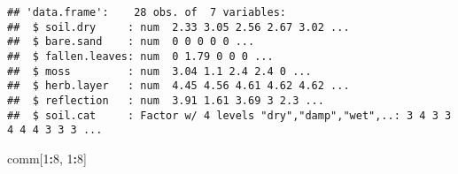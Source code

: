 \documentclass[
]{article}
\newenvironment{Shaded}{\begin{snugshade}}{\end{snugshade}}
\newcommand{\CommentTok}[1]{\textcolor[rgb]{0.56,0.35,0.01}{\textit{#1}}}
\newcommand{\DataTypeTok}[1]{\textcolor[rgb]{0.13,0.29,0.53}{#1}}
\newcommand{\DecValTok}[1]{\textcolor[rgb]{0.00,0.00,0.81}{#1}}
\newcommand{\KeywordTok}[1]{\textcolor[rgb]{0.13,0.29,0.53}{\textbf{#1}}}
\newcommand{\NormalTok}[1]{#1}
\newcommand{\OperatorTok}[1]{\textcolor[rgb]{0.81,0.36,0.00}{\textbf{#1}}}
\newcommand{\StringTok}[1]{\textcolor[rgb]{0.31,0.60,0.02}{#1}}
\begin{document}
\begin{Shaded}
\end{Shaded}

\begin{verbatim}
## 'data.frame':    28 obs. of  7 variables:
##  $ soil.dry     : num  2.33 3.05 2.56 2.67 3.02 ...
##  $ bare.sand    : num  0 0 0 0 0 ...
##  $ fallen.leaves: num  0 1.79 0 0 0 ...
##  $ moss         : num  3.04 1.1 2.4 2.4 0 ...
##  $ herb.layer   : num  4.45 4.56 4.61 4.62 4.62 ...
##  $ reflection   : num  3.91 1.61 3.69 3 2.3 ...
##  $ soil.cat     : Factor w/ 4 levels "dry","damp","wet",..: 3 4 3 3 4 4 4 3 3 3 ...
\end{verbatim}

\begin{Shaded}
\begin{Highlighting}[]
\NormalTok{comm[}\DecValTok{1}\OperatorTok{:}\DecValTok{8}\NormalTok{, }\DecValTok{1}\OperatorTok{:}\DecValTok{8}\NormalTok{]}
\end{Highlighting}
\end{Shaded}
\end{document}
